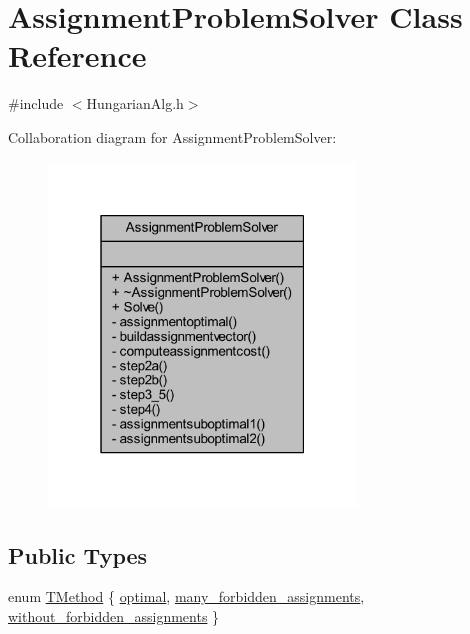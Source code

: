 \hypertarget{class_assignment_problem_solver}{}\section{Assignment\+Problem\+Solver Class Reference}
\label{class_assignment_problem_solver}


{\ttfamily \#include $<$Hungarian\+Alg.\+h$>$}



Collaboration diagram for Assignment\+Problem\+Solver\+:\nopagebreak
\begin{figure}[H]
\begin{center}
\leavevmode
\includegraphics[width=232pt]{class_assignment_problem_solver__coll__graph}
\end{center}
\end{figure}
\subsection*{Public Types}
\begin{DoxyCompactItemize}
\item 
enum \mbox{\hyperlink{class_assignment_problem_solver_aec407eb73fed9d3ddb9467fde90a85e8}{T\+Method}} \{ \mbox{\hyperlink{class_assignment_problem_solver_aec407eb73fed9d3ddb9467fde90a85e8a84f2334f61866dba64befa6910848d75}{optimal}}, 
\mbox{\hyperlink{class_assignment_problem_solver_aec407eb73fed9d3ddb9467fde90a85e8a226c2e4b79d0beeb342087880d97bb2a}{many\+\_\+forbidden\+\_\+assignments}}, 
\mbox{\hyperlink{class_assignment_problem_solver_aec407eb73fed9d3ddb9467fde90a85e8a3329e7571829a83b21be4821df62310d}{without\+\_\+forbidden\+\_\+assignments}}
 \}
\end{DoxyCompactItemize}
